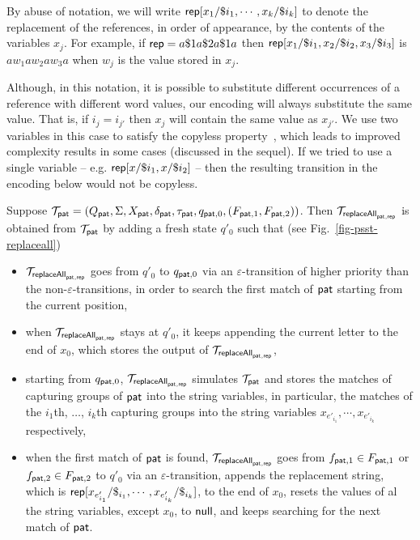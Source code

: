 By abuse of notation, we will write
$\mathsf{rep}[x_1/\$i_1,\cdots,x_k/\$i_k]$
to denote the replacement of the references, in order of appearance, by the contents of the variables $x_j$.
For example, if
$\mathsf{rep} = a \$1 a \$2 a \$1 a$
then
$\mathsf{rep}[x_1/\$i_1, x_2/\$i_2,x_3/\$i_3]$
is $a w_1 a w_2 a w_3 a$ when $w_j$ is the value stored in $x_j$.

Although, in this notation, it is possible to substitute different occurrences of a reference with different word values, our encoding will always substitute the same value.
That is, if $i_j = i_{j'}$ then $x_j$ will contain the same value as $x_{j'}$.
We use two variables in this case to satisfy the copyless property~\cite{AC10}, which leads to improved complexity results in some cases (discussed in the sequel).
If we tried to use a single variable – e.g. $\mathsf{rep}[x/\$i_1,x/\$i_2]$ – then the resulting transition in the encoding below would not be copyless.

 Suppose $\mathcal{T}_{\mathsf{pat}} = (Q_{\mathsf{pat}}, \Sigma, X_{\mathsf{pat}}, \delta_{\mathsf{pat}}, \tau_{\mathsf{pat}}, q_{\mathsf{pat},0}, (F_{\mathsf{pat},1}, F_{\mathsf{pat},2}))$.
Then $\mathcal{T}_{\mathsf{replaceAll}_{\mathsf{pat},\mathsf{rep}}}$ is obtained from $\mathcal{T}_{\mathsf{pat}}$ by adding a fresh state $q'_0$ such that (see Fig.~\ref{fig-psst-replaceall})
\begin{itemize}
    \item $\mathcal{T}_{\mathsf{replaceAll}_{\mathsf{pat},\mathsf{rep}}}$ goes from $q'_0$ to $q_{\mathsf{pat},0}$ via an $\varepsilon$-transition of higher priority than the non-$\varepsilon$-transitions, in order to search the first match of $\mathsf{pat}$ starting from the current position,
    \item when $\mathcal{T}_{\mathsf{replaceAll}_{\mathsf{pat},\mathsf{rep}}}$ stays at $q'_0$, it keeps appending the current letter to the end of $x_0$, which stores the output of $\mathcal{T}_{\mathsf{replaceAll}_{\mathsf{pat},\mathsf{rep}}}$,
    \item starting from $q_{\mathsf{pat}, 0}$, $\mathcal{T}_{\mathsf{replaceAll}_{\mathsf{pat},\mathsf{rep}}}$ simulates $\mathcal{T}_{\mathsf{pat}}$ and stores the matches of capturing groups of $\mathsf{pat}$ into the string variables, in particular,
    the matches of the $i_1$th, $\ldots$, $i_k$th capturing groups into the string variables $x_{e'_{i_1}}, \cdots, x_{e'_{i_k}}$ respectively,
    \item when the first match of $\mathsf{pat}$ is found, $\mathcal{T}_{\mathsf{replaceAll}_{\mathsf{pat},\mathsf{rep}}}$ goes from $f_{\mathsf{pat},1} \in F_{\mathsf{pat}, 1}$ or $f_{\mathsf{pat}, 2} \in F_{\mathsf{pat}, 2}$ to $q'_0$ via an $\varepsilon$-transition, appends the replacement string, which is $\mathsf{rep}[x_{e'_{i_1}}/\$_{i_1}, \cdots, x_{e'_{i_k}}/\$_{i_k}]$, to the end of $x_0$, resets the values of al the string variables, except $x_0$, to $\mathsf{null}$, and keeps searching for the next match of $\mathsf{pat}$.
\end{itemize}

